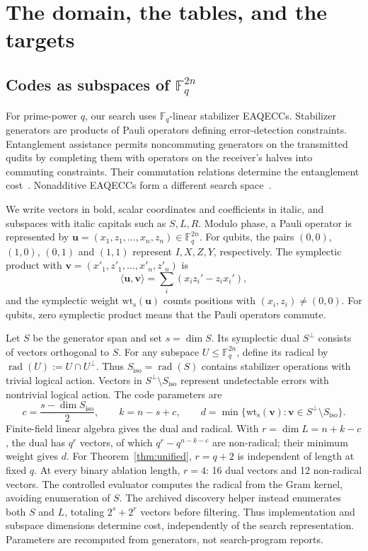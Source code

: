 \documentclass{article}
\newcommand{\F}{\mathbb{F}}
\newcommand{\vct}[1]{\boldsymbol{#1}} %
\newcommand{\wt}{\operatorname{wt_s}}
\begin{document}
\clearpage



\appendix
\raggedbottom
\section{The domain, the tables, and the targets}\label{app:domain}

\subsection{Codes as subspaces of $\F_q^{2n}$}\label{app:symplectic}
For prime-power $q$, our search uses $\F_q$-linear stabilizer EAQECCs.
Stabilizer generators are products of Pauli operators defining
error-detection constraints. Entanglement assistance permits noncommuting
generators on the transmitted qudits by completing them with operators
on the receiver's halves into commuting constraints. Their commutation
relations determine the entanglement cost~\citep{BrunDevetakHsieh2006,WildeBrun2008}.
Nonadditive EAQECCs form a different search space~\citep{Shin2011}.

We write vectors in bold, scalar coordinates and coefficients in italic,
and subspaces with italic capitals such as $S,L,R$.
Modulo phase, a Pauli operator is represented by
$\vct{u}=(x_1,z_1,\ldots,x_n,z_n)\in\F_q^{2n}$. For qubits, the pairs
$(0,0)$, $(1,0)$, $(0,1)$ and $(1,1)$ represent $I,X,Z,Y$, respectively. The
symplectic product with $\vct{v}=(x'_1,z'_1,\ldots,x'_n,z'_n)$ is
\[
 \langle \vct{u},\vct{v}\rangle=\sum_i(x_i z_i'-z_i x_i'),
\]
and the symplectic weight $\wt(\vct{u})$ counts positions with
$(x_i,z_i)\ne(0,0)$. For qubits, zero symplectic product means that
the Pauli operators commute.

Let $S$ be the generator span and set $s=\dim S$. Its symplectic dual
$S^\perp$ consists of vectors orthogonal to $S$.
For any subspace $U\le\F_q^{2n}$, define its radical by
$\operatorname{rad}(U):=U\cap U^\perp$. Thus
$S_{\mathrm{iso}}=\operatorname{rad}(S)$ contains stabilizer
operations with trivial logical action. Vectors in
$S^\perp\setminus S_{\mathrm{iso}}$ represent undetectable errors
with nontrivial logical action. The code parameters are
\[
  c=\frac{s-\dim S_{\mathrm{iso}}}{2},\qquad
  k = n - s + c, \qquad
  d = \min\{\wt(\vct{v}) : \vct{v} \in S^{\perp}\setminus S_{\mathrm{iso}}\}.
\]
Finite-field linear algebra gives the dual and radical. With
$r=\dim L=n+k-c$, the dual has $q^r$ vectors, of which
$q^r-q^{n-k-c}$ are non-radical; their minimum weight gives $d$.
For Theorem~\ref{thm:unified}, $r=q+2$ is independent of length at fixed $q$.
At every binary ablation length, $r=4$: 16 dual vectors and 12
non-radical vectors. The controlled evaluator computes the radical
from the Gram kernel, avoiding enumeration of $S$. The archived
discovery helper instead enumerates both $S$ and $L$, totaling
$2^s+2^r$ vectors before filtering. Thus implementation and subspace
dimensions determine cost, independently of the search representation.
Parameters are recomputed from generators, not search-program reports.
\end{document}
